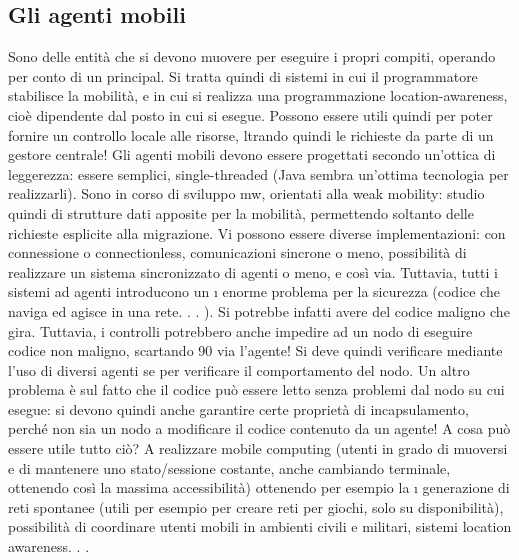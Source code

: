 \subsection{Gli agenti mobili}
Sono delle entità che si devono muovere per eseguire i propri compiti, operando
per conto di un principal. Si tratta quindi di sistemi in cui il programmatore stabilisce la mobilità, e in cui si
realizza una programmazione location-awareness,
cioè dipendente dal posto in cui si esegue. Possono essere utili quindi per poter
fornire un controllo locale alle risorse, ltrando quindi le richieste da parte di un
gestore centrale! Gli agenti mobili devono essere progettati secondo un'ottica di
leggerezza: essere semplici, single-threaded (Java sembra un'ottima tecnologia
per realizzarli). Sono in corso di sviluppo mw, orientati alla weak mobility:
studio quindi di strutture dati apposite per la mobilità, permettendo soltanto
delle richieste esplicite alla migrazione.
Vi possono essere diverse implementazioni: con connessione o connectionless,
comunicazioni sincrone o meno, possibilità di realizzare un sistema sincronizzato
di agenti o meno, e così via. Tuttavia, tutti i sistemi ad agenti introducono un
\i{}
enorme problema per la sicurezza (codice che naviga ed agisce in una rete. . . ). Si
potrebbe infatti avere del codice maligno che gira. Tuttavia, i controlli potrebbero anche impedire ad un nodo di
eseguire codice non maligno, scartando
90
via l'agente! Si deve quindi verificare mediante l'uso di diversi agenti se per
verificare il comportamento del nodo.
Un altro problema è sul fatto che il codice può essere letto senza problemi
dal nodo su cui esegue: si devono quindi anche garantire certe proprietà di
incapsulamento, perché non sia un nodo a modificare il codice contenuto da un
agente!
A cosa può essere utile tutto ciò? A realizzare mobile computing (utenti in
grado di muoversi e di mantenere uno stato/sessione costante, anche cambiando
terminale, ottenendo così la massima accessibilità) ottenendo per esempio la
\i{}
generazione di reti spontanee (utili per esempio per creare reti per giochi, solo su
disponibilità), possibilità di coordinare utenti mobili in ambienti civili e militari,
sistemi location awareness. . .